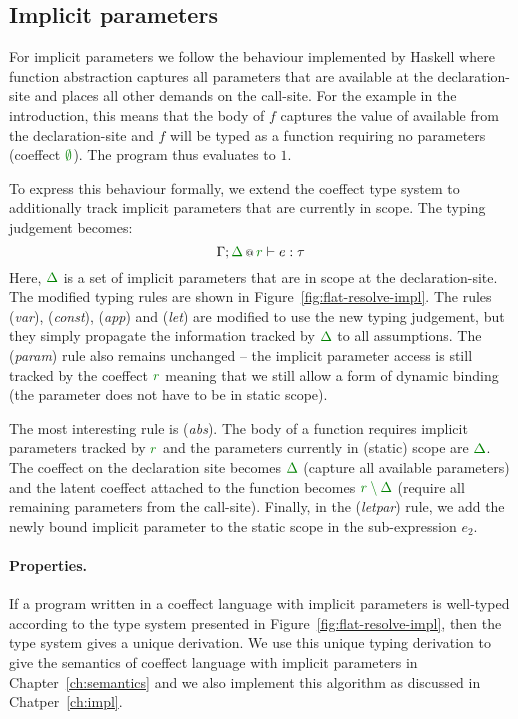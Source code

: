 \subsection{Implicit parameters}

For implicit parameters we follow the behaviour implemented by Haskell \cite{app-implicit-parameters}
where function abstraction captures all parameters that are available at the declaration-site and
places all other demands on the call-site. For the example in the introduction, this means
that the body of $f$ captures the value of  available from the declaration-site
and $f$ will be typed as a function requiring no parameters (coeffect $\cclrd{\emptyset}$). The
program thus evaluates to $1$.

To express this behaviour formally, we extend the coeffect type system to additionally track
implicit parameters that are currently in scope. The typing judgement becomes:
%
\begin{equation*}
\coctx{\Gamma;\cclrd{\Delta}}{\cclrd{r}} \vdash e : \tau
\end{equation*}
%
Here, $\cclrd{\Delta}$ is a set of implicit parameters that are in scope at the declaration-site.
The modified typing rules are shown in Figure~\ref{fig:flat-resolve-impl}. The rules (\emph{var}),
(\emph{const}), (\emph{app}) and (\emph{let}) are modified to use the new typing judgement, but they
simply propagate the information tracked by $\cclrd{\Delta}$ to all assumptions. The (\emph{param})
rule also remains unchanged -- the implicit parameter access is still tracked by the coeffect
$\cclrd{r}$ meaning that we still allow a form of dynamic binding (the parameter does not have
to be in static scope).

The most interesting rule is (\emph{abs}). The body of a function requires implicit parameters
tracked by $\cclrd{r}$ and the parameters currently in (static) scope are $\cclrd{\Delta}$.
The coeffect on the declaration site becomes $\cclrd{\Delta}$ (capture all available parameters)
and the latent coeffect attached to the function becomes $\cclrd{r\setminus\Delta}$ (require all
remaining parameters from the call-site). Finally, in the (\emph{letpar}) rule, we add the newly
bound implicit parameter  to the static scope in the sub-expression $e_2$.

\paragraph{Properties.}
If a program written in a coeffect language with implicit parameters is well-typed according to the
type system presented in Figure~\ref{fig:flat-resolve-impl}, then the type system gives a unique
derivation. We use this unique typing derivation to give the semantics of coeffect language
with implicit parameters in Chapter~\ref{ch:semantics} and we also implement this algorithm as
discussed in Chatper~\ref{ch:impl}.


